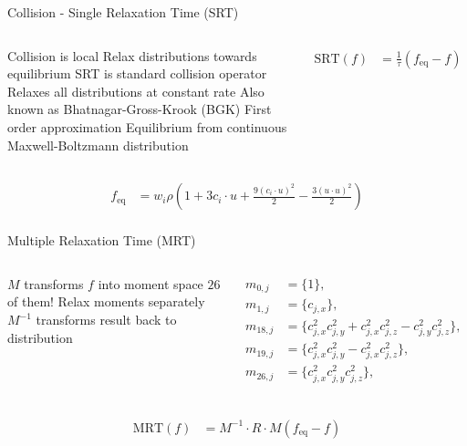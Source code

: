 \begin{frame}{Collision - Single Relaxation Time (SRT)}
\begin{columns}
\begin{outline}
\1 Collision is local
\1 Relax distributions towards equilibrium
\1 SRT is standard collision operator
\2 Relaxes all distributions at constant rate
\2 Also known as Bhatnagar-Gross-Krook (BGK)
\1 First order approximation
\1 Equilibrium from continuous Maxwell-Boltzmann distribution
\end{outline}
\begin{center}
\begin{align*}
    \text{SRT}(f) &= \frac{1}{\tau} (f_{\text{eq}} - f)
\end{align*}

\end{center}
\end{columns}
\vspace{0.5cm}

\begin{align*}
   f_{\text{eq}} &= w_i \rho \left(
1 + 3 c_i \cdot u  + \frac{9 (c_i \cdot u)^2}{2}
- \frac{3 (u \cdot u)^2}{2}\right) \\
\end{align*}


\end{frame}

\begin{frame}{Multiple Relaxation Time (MRT)}
\begin{columns}
\begin{outline}
\1 $M$ transforms $f$ into moment space
\1 $26$ of them!
\1 Relax moments separately
\1 $M^{-1}$ transforms result back to distribution
\end{outline}
\begin{center}
\begin{align*}
m_{0,j} &= \{  1 \},\\
m_{1,j} &= \{  c_{j,x} \}, \\
m_{18,j} &= \{ c_{j,x}^2 c_{j,y}^2 + c_{j,x}^2 c_{j,z}^2 - c_{j,y}^2 c_{j,z}^2 \}, \\
m_{19,j} &= \{ c_{j,x}^2 c_{j,y}^2 - c_{j,x}^2 c_{j,z}^2 \},\\
m_{26,j} &= \{ c_{j,x}^2 c_{j,y}^2 c_{j,z}^2 \},\\
\end{align*}
\end{center}
\end{columns}
\begin{center}
  \begin{align*}
\text{MRT}(f) &= M^{-1} \cdot R \cdot M(f_{\text{eq}} - f)
  \end{align*}
\end{center}
\end{frame}

